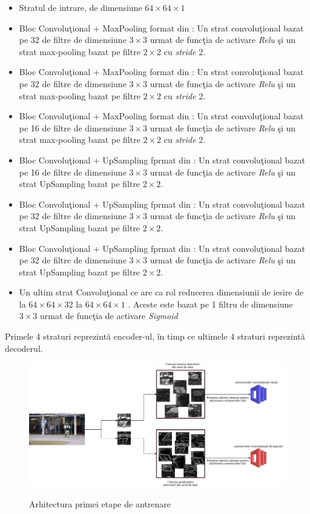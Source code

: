 \documentclass[a4paper,12pt]{report}
\begin{document}
\begin{itemize}
\item Stratul de intrare, de dimensiune \( 64 \times 64 \times 1\)
\item Bloc  Convoluţional + MaxPooling format din : Un strat convoluţional bazat pe 32 de filtre de dimensiune \(3 \times 3\) urmat de funcţia de activare \emph{Relu} şi un strat max-pooling bazat pe filtre \(2 \times 2\) cu \emph{stride} 2.
\item Bloc  Convoluţional + MaxPooling format din : Un strat convoluţional bazat pe 32 de filtre de dimensiune \(3 \times 3\) urmat de funcţia de activare \emph{Relu} şi un strat max-pooling bazat pe filtre \(2 \times 2\) cu \emph{stride} 2.
\item Bloc  Convoluţional + MaxPooling format din : Un strat convoluţional bazat pe 16 de filtre de dimensiune \(3 \times 3\) urmat de funcţia de activare \emph{Relu} şi un strat max-pooling bazat pe filtre \(2 \times 2\) cu \emph{stride} 2.
\item Bloc Convoluţional + UpSampling fprmat din : Un strat convoluţional bazat pe 16 de filtre de dimensiune \(3 \times 3\) urmat de funcţia de activare \emph{Relu} şi un strat UpSampling bazat pe filtre \(2 \times 2\).
\item Bloc Convoluţional + UpSampling fprmat din : Un strat convoluţional bazat pe 32 de filtre de dimensiune \(3 \times 3\) urmat de funcţia de activare \emph{Relu} şi un strat UpSampling bazat pe filtre \(2 \times 2\).
\item Bloc Convoluţional + UpSampling fprmat din : Un strat convoluţional bazat pe 32 de filtre de dimensiune \(3 \times 3\) urmat de funcţia de activare \emph{Relu} şi un strat UpSampling bazat pe filtre \(2 \times 2\).
\item Un ultim strat Convoluţional ce are ca rol reducerea dimensiunii de iesire de la \(64 \times 64 \times 32\) la \(64 \times 64 \times 1\)\cite{ionescu2019object} .  Aceste este bazat pe 1 filtru de dimensiune \(3 \times 3 \) urmat de funcţia de activare \emph{Sigmoid}
\end{itemize}
Primele 4 straturi reprezintă encoder-ul, în timp ce ultimele 4 straturi reprezintă decoderul. 
\clearpage
\begin{figure}[h]
\begin{center}
        \includegraphics[width=1\textwidth]{images/training_stage1_architecture}
			 \label{fig:stage1_architecture}
			 \caption{Arhitectura primei etape de antrenare}
\end{center}
\end{figure}
\end{document}
